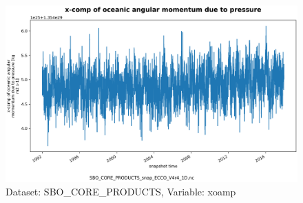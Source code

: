 \begin{figure}[H]
\centering
\includegraphics[scale=0.55]{../images/plots/oneD_plots/SBO_Core_Products/xoamp.png}
\caption{Dataset: SBO\_CORE\_PRODUCTS, Variable: xoamp}
\label{tab:table-SBO_CORE_PRODUCTS_xoamp-Plot}
\end{figure}
\newpage
\pagebreak
